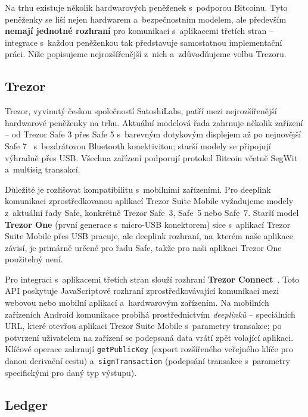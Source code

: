 Na trhu existuje několik hardwarových peněženek s~podporou Bitcoinu.
Tyto peněženky se liší nejen hardwarem a~bezpečnostním modelem, ale
především \textbf{nemají jednotné rozhraní} pro komunikaci s~aplikacemi
třetích stran -- integrace s~každou peněženkou tak představuje
samostatnou implementační práci. Níže popisujeme nejrozšířenější
z~nich a~zdůvodňujeme volbu Trezoru.

\subsection{Trezor}
\label{sec:trezor}

Trezor, vyvinutý českou společností SatoshiLabs, patří mezi nejrozšířenější
hardwarové peněženky na trhu. Aktuální modelová řada zahrnuje několik zařízení
-- od Trezor Safe 3 přes Safe 5 s~barevným dotykovým displejem až po nejnovější
Safe 7~\citep{TrezorSafe7} s~bezdrátovou Bluetooth konektivitou; starší
modely se připojují výhradně přes USB. Všechna zařízení podporují protokol Bitcoin včetně SegWit
a~multisig transakcí.

Důležité je rozlišovat kompatibilitu s~mobilními zařízeními. Pro deeplink
komunikaci zprostředkovanou aplikací Trezor Suite Mobile vyžadujeme modely
z~aktuální řady Safe, konkrétně Trezor Safe~3, Safe~5 nebo Safe~7. Starší
model \textbf{Trezor One} (první generace s~micro-USB konektorem) sice
s~aplikací Trezor Suite Mobile přes USB pracuje, ale deeplink rozhraní,
na~kterém naše aplikace závisí, je primárně určené pro řadu Safe, takže
pro naši aplikaci Trezor One použitelný není.

Pro integraci s~aplikacemi třetích stran slouží rozhraní
\textbf{Trezor Connect}~\citep{TrezorConnect}. Toto API poskytuje
JavaScriptové rozhraní zprostředkovávající komunikaci mezi webovou nebo
mobilní aplikací a~hardwarovým zařízením. Na mobilních zařízeních Android
komunikace probíhá prostřednictvím \emph{deeplinků} -- speciálních URL,
které otevřou aplikaci Trezor Suite Mobile s~parametry transakce; po
potvrzení uživatelem na zařízení se podepsaná data vrátí zpět volající
aplikaci. Klíčové operace zahrnují \texttt{getPublicKey} (export
rozšířeného veřejného klíče pro danou derivační cestu) a~\texttt{signTransaction}
(podepsání transakce s~parametry specifickými pro daný typ výstupu).

\subsection{Ledger}
\label{sec:ledger}

